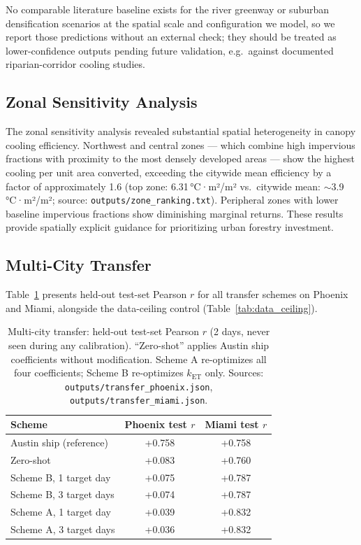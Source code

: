 \documentclass[12pt, letterpaper]{article}
\begin{document}
No comparable literature baseline exists for the river greenway or suburban
densification scenarios at the spatial scale and configuration we model, so
we report those predictions without an external check; they should be
treated as lower-confidence outputs pending future validation, e.g.\ against
documented riparian-corridor cooling studies.

\subsection{Zonal Sensitivity Analysis}
\label{sec:zonal}

The zonal sensitivity analysis revealed substantial spatial heterogeneity in
canopy cooling efficiency. Northwest and central zones — which combine high
impervious fractions with proximity to the most densely developed areas —
show the highest cooling per unit area converted, exceeding the citywide
mean efficiency by a factor of approximately 1.6 (top zone: 6.31\,°C·m²/m²
vs.\ citywide mean: $\sim$3.9\,°C·m²/m²; source:
\texttt{outputs/zone\_ranking.txt}). Peripheral zones with lower
baseline impervious fractions show diminishing marginal returns. These
results provide spatially explicit guidance for prioritizing urban forestry
investment.

\subsection{Multi-City Transfer}
\label{sec:transfer}

Table~\ref{tab:transfer} presents held-out test-set Pearson $r$ for all
transfer schemes on Phoenix and Miami, alongside the data-ceiling control
(Table~\ref{tab:data_ceiling}).

\begin{table}[ht]
  \centering
  \caption{Multi-city transfer: held-out test-set Pearson $r$ (2 days,
  never seen during any calibration). ``Zero-shot'' applies Austin ship
  coefficients without modification. Scheme A re-optimizes all four
  coefficients; Scheme B re-optimizes $k_{\mathrm{ET}}$ only.
  Sources: \texttt{outputs/transfer\_phoenix.json},
  \texttt{outputs/transfer\_miami.json}.}
  \label{tab:transfer}
  \begin{tabular}{lcc}
    \toprule
    Scheme & Phoenix test $r$ & Miami test $r$ \\
    \midrule
    Austin ship (reference)        & +0.758 & +0.758 \\
    Zero-shot                       & +0.083 & +0.760 \\
    Scheme B, 1 target day          & +0.075 & +0.787 \\
    Scheme B, 3 target days         & +0.074 & +0.787 \\
    Scheme A, 1 target day          & +0.039 & +0.832 \\
    Scheme A, 3 target days         & +0.036 & +0.832 \\
    \bottomrule
  \end{tabular}
\end{table}
\end{document}
